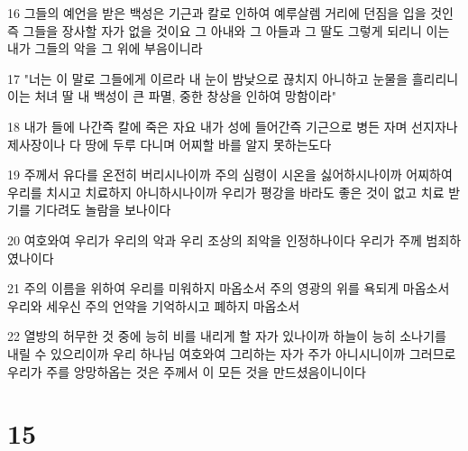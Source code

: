 \par 16 그들의 예언을 받은 백성은 기근과 칼로 인하여 예루살렘 거리에 던짐을 입을 것인즉 그들을 장사할 자가 없을 것이요 그 아내와 그 아들과 그 딸도 그렇게 되리니 이는 내가 그들의 악을 그 위에 부음이니라
\par 17 "너는 이 말로 그들에게 이르라 내 눈이 밤낮으로 끊치지 아니하고 눈물을 흘리리니 이는 처녀 딸 내 백성이 큰 파멸, 중한 창상을 인하여 망함이라"
\par 18 내가 들에 나간즉 칼에 죽은 자요 내가 성에 들어간즉 기근으로 병든 자며 선지자나 제사장이나 다 땅에 두루 다니며 어찌할 바를 알지 못하는도다
\par 19 주께서 유다를 온전히 버리시나이까 주의 심령이 시온을 싫어하시나이까 어찌하여 우리를 치시고 치료하지 아니하시나이까 우리가 평강을 바라도 좋은 것이 없고 치료 받기를 기다려도 놀람을 보나이다
\par 20 여호와여 우리가 우리의 악과 우리 조상의 죄악을 인정하나이다 우리가 주께 범죄하였나이다
\par 21 주의 이름을 위하여 우리를 미워하지 마옵소서 주의 영광의 위를 욕되게 마옵소서 우리와 세우신 주의 언약을 기억하시고 폐하지 마옵소서
\par 22 열방의 허무한 것 중에 능히 비를 내리게 할 자가 있나이까 하늘이 능히 소나기를 내릴 수 있으리이까 우리 하나님 여호와여 그리하는 자가 주가 아니시니이까 그러므로 우리가 주를 앙망하옵는 것은 주께서 이 모든 것을 만드셨음이니이다

\chapter{15}

